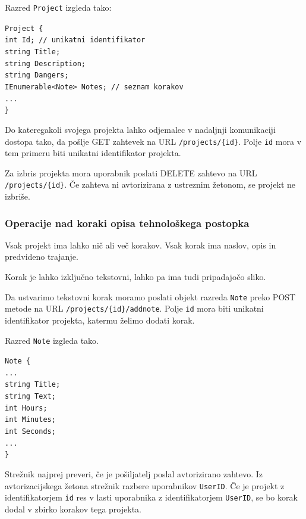 \documentclass[a4paper, 12pt]{book}
\begin{document}
\noindent Razred \texttt{Project} izgleda tako:

\noindent \texttt{Project \{ \\
int Id; // unikatni identifikator \\
string Title; \\
string Description; \\
string Dangers; \\
IEnumerable<Note> Notes; // seznam korakov \\
... \\
\}
}


Do kateregakoli svojega projekta lahko odjemalec v nadaljnji komunikaciji dostopa tako, da pošlje GET zahtevek na URL \texttt{/projects/\{id\}}.
Polje \texttt{id} mora v tem primeru biti unikatni identifikator projekta.

Za izbris projekta mora uporabnik poslati DELETE zahtevo na URL \texttt{/projects/\{id\}}.
Če zahteva ni avtorizirana z ustreznim žetonom, se projekt ne izbriše.

\subsubsection{Operacije nad koraki opisa tehnološkega postopka}

Vsak projekt ima lahko nič ali več korakov.
Vsak korak ima naslov, opis in predvideno trajanje.

Korak je lahko izključno tekstovni, lahko pa ima tudi pripadajočo sliko.

Da ustvarimo tekstovni korak moramo poslati objekt razreda \texttt{Note} preko POST metode na URL \texttt{/projects/\{id\}/addnote}.
Polje \texttt{id} mora biti unikatni identifikator projekta, katermu želimo dodati korak.

\noindent Razred \texttt{Note} izgleda tako.

\noindent \texttt{Note \{ \\
...\\ 
string Title; \\
string Text; \\
int Hours; \\
int Minutes; \\
int Seconds; \\
...\\ 
\} }

Strežnik najprej preveri, če je pošiljatelj poslal avtorizirano zahtevo.
Iz avtorizacijskega žetona strežnik razbere uporabnikov \texttt{UserID}. 
Če je projekt z identifikatorjem \texttt{id} res v lasti uporabnika z identifikatorjem \texttt{UserID}, se bo korak dodal v zbirko korakov tega projekta.
\end{document}
